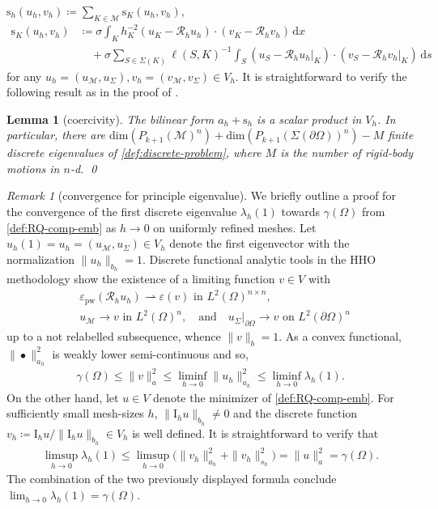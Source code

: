 \documentclass[a4paper]{amsart}
\numberwithin{equation}{section}
\renewcommand{\d}[1]{\,\mathrm{d}#1}
\newcommand{\Mcal}{\mathcal{M}}
\newcommand{\s}{\mathrm{s}}
\newcommand{\pw}{\mathrm{pw}}
\newtheorem{lemma}[theorem]{Lemma}
\theoremstyle{remark}
\newtheorem{remark}[theorem]{Remark}
\theoremstyle{definition}
\theoremstyle{assumptionnoperiod}
\begin{document}
$\s_h(u_h, v_h) \coloneqq \sum_{K \in \mathcal{M}} \s_K(u_h,v_h)$,
\begin{align}\label{def:comp-emb-s}
	\s_K(u_h, v_h) &\coloneqq \sigma \int_K h_K^{-2} (u_K - \mathcal{R}_h u_h) \cdot (v_K - \mathcal{R}_h v_h) \d{x}\nonumber\\
	&\quad + \sigma\sum_{S \in \Sigma(K)} \ell(S,K)^{-1} \int_S (u_S - \mathcal{R}_h u_h|_K) \cdot (v_S - \mathcal{R}_h v_h|_K) \d{s}
\end{align}
for any $u_h = (u_\Mcal, u_\Sigma), v_h = (v_\Mcal, v_\Sigma) \in V_h$.
It is straightforward to verify the following result as in the proof of .
\begin{lemma}[coercivity]\label{lem:well-posedness-compact-embedding}
	The bilinear form $a_h + \s_h$ is a scalar product in $V_h$. In particular, there are $\mathrm{dim}(P_{k+1}(\Mcal)^{n}) + \mathrm{dim}(P_{k+1}(\Sigma(\partial \Omega))^{n}) - M$ finite discrete eigenvalues of \eqref{def:discrete-problem}, where $M$ is the number of rigid-body motions in $n$-d. \qed
\end{lemma}
\begin{remark}[convergence for principle eigenvalue]
	We briefly outline a proof for the convergence of the first discrete eigenvalue $\lambda_h(1)$ towards $\gamma(\Omega)$ from \eqref{def:RQ-comp-emb} as $h \to 0$ on uniformly refined meshes. Let $u_h(1) = u_h = (u_\Mcal,u_\Sigma) \in V_h$ denote the first eigenvector with the normalization $\|u_h\|_{b_h} = 1$.
	Discrete functional analytic tools in the HHO methodology
	\cite[Theorem 6.8]{DiPietroDroniou2020} show the existence of a limiting function $v \in V$ with
	\begin{align*}
		&\varepsilon_\pw(\mathcal{R}_h u_h) \rightharpoonup \varepsilon(v) \text{ in } L^2(\Omega)^{n \times n},\\ 
		&u_\Mcal \to v \text{ in } L^2(\Omega)^n,
		\quad\text{and}\quad u_\Sigma|_{\partial \Omega} \to v \text{ on } L^2(\partial \Omega)^n
	\end{align*}
	up to a not relabelled subsequence,
	whence $\|v\|_b = 1$. As a convex functional, $\|\bullet\|_{a_h}^2$ is weakly lower semi-continuous and so,
	\begin{align*}
		\gamma(\Omega) \leq \|v\|_a^2 \leq \liminf_{h \to 0} \|u_h\|_{a_h}^2 \leq \liminf_{h \to 0} \lambda_h(1).
	\end{align*}
	On the other hand, let $u \in V$ denote the minimizer of \eqref{def:RQ-comp-emb}. For sufficiently small mesh-sizes $h$, $\|\mathrm{I}_h u\|_{b_h} \neq 0$ and the discrete function
	$v_h \coloneqq \mathrm{I}_h u/\|\mathrm{I}_h u\|_{b_h} \in V_h$ is well defined. 
	It is straightforward to verify that
	\begin{align*}
		\limsup_{h \to 0} \lambda_h(1) \leq \limsup_{h \to 0} \big(\|v_h\|_{a_h}^2 + \|v_h\|_{s_h}^2\big) = \|u\|_{a}^2 = \gamma(\Omega).
	\end{align*}
	The combination of the two previously displayed formula conclude $\lim_{h \to 0} \lambda_h(1) = \gamma(\Omega)$.
\end{remark}
\end{document}
